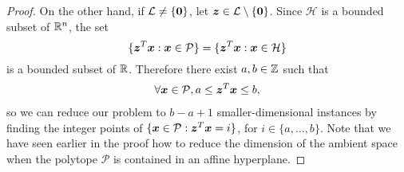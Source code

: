 \begin{proof}
On the other hand, if
${\cal{L}} \neq \lbrace \boldsymbol{0} \rbrace$, let
$\boldsymbol{z} \in {\cal{L}} \setminus \lbrace \boldsymbol{0}
\rbrace$.
Since $\mathcal{H}$ is a bounded subset of $\mathbb{R}^n$, the set
\[ \{ \boldsymbol{z}^T\boldsymbol{x} : \boldsymbol{x}\in \mathcal{P} \} =
   \{ \boldsymbol{z}^T\boldsymbol{x} : \boldsymbol{x}\in \mathcal{H} \} \]
is a bounded subset of $\mathbb{R}$.
Therefore there exist
$a,b \in \mathbb{Z}$ such that
\begin{align*}
\forall \boldsymbol{x} \in \mathcal{P}, a \leq \boldsymbol{z}^{T} \boldsymbol{x} \leq b ,
\end{align*}
so we can reduce our problem to $b-a+1$ smaller-dimensional instances
by finding the integer points of
$\lbrace \boldsymbol{x} \in \mathcal{P} :
\boldsymbol{z}^{T} \boldsymbol{x} = i \rbrace$,
for $i \in \lbrace a, \ldots, b \rbrace$. Note that we have seen
earlier in the proof how to reduce the dimension of the ambient space
when the polytope $\mathcal{P}$ is contained in an affine
hyperplane.
\end{proof}

